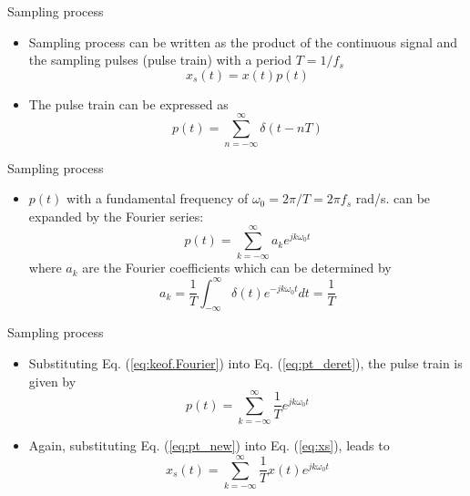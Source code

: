\documentclass[pdflatex,compress,mathserif]{beamer}
\begin{document}
\begin{frame}{Sampling process}
    \begin{itemize}
        \item Sampling process can be written as the product of the continuous signal and the sampling pulses (pulse train) with a period $T = 1/f_s$
        \begin{equation}
            x_s(t) = x(t) p(t)
            \label{eq:xs}
        \end{equation}
        \item The pulse train can be expressed as
        \begin{equation}
            p(t) = \sum_{n = - \infty}^\infty \delta(t - nT)
        \end{equation}
    \end{itemize}
\end{frame}

\begin{frame}{Sampling process}
    \begin{itemize}
        \item $p(t)$ with a fundamental frequency of $\omega_0 = 2\pi/T = 2\pi f_s$ rad/s. can be expanded by the Fourier series:
        \begin{equation}
            p(t) = \sum_{k = - \infty}^\infty a_k e^{jk\omega_0t}
            \label{eq:pt_deret}
        \end{equation}
        where $a_k$ are the Fourier coefficients which can be determined by
        \begin{equation}
            a_k = \frac{1}{T} \int_{-\infty}^{\infty} \delta(t)e^{-jk\omega_0t}dt = \frac{1}{T}
            \label{eq:keof.Fourier}
        \end{equation}
    \end{itemize}
\end{frame}

\begin{frame}{Sampling process}
    \begin{itemize}
        \item Substituting Eq. (\ref{eq:keof.Fourier}) into Eq. (\ref{eq:pt_deret}), the pulse train is given by
        \begin{equation}
            p(t) = \sum_{k = -\infty}^{\infty} \frac{1}{T} e^{jk\omega_0t}
            \label{eq:pt_new}
        \end{equation}
        \item Again, substituting Eq. (\ref{eq:pt_new}) into Eq. (\ref{eq:xs}),  leads to
        \begin{equation}
            x_s(t) = \sum_{k = -\infty}^{\infty} \frac{1}{T} x(t) e^{jk\omega_0t}
            \label{eq:xs_new}
        \end{equation}
    \end{itemize}
\end{frame}
\end{document}
